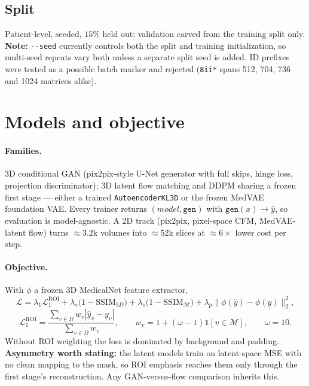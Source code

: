 \documentclass[11pt]{article}
\newcommand{\yhat}{\hat{y}}
\newcommand{\roi}{\mathcal{M}}
\newcommand{\1}{\mathbb{1}}
\newcommand{\flag}[1]{\textcolor{red!60!black}{\textbf{#1}}}
\begin{document}
\subsection{Split}

Patient-level, seeded, $15\%$ held out; validation carved from the training split only.
\flag{Note:} \texttt{-{}-seed} currently controls both the split and training
initialization, so multi-seed repeats vary both unless a separate split seed is added.
ID prefixes were tested as a possible batch marker and rejected (\texttt{8ii*} spans 512,
704, 736 and 1024 matrices alike).

\section{Models and objective}

\paragraph{Families.} 3D conditional GAN (pix2pix-style U-Net generator with full skips,
hinge loss, projection discriminator); 3D latent flow matching and DDPM sharing a frozen
first stage --- either a trained \texttt{AutoencoderKL3D} or the frozen MedVAE foundation
VAE. Every trainer returns $(model, \texttt{gen})$ with $\texttt{gen}(x)\to\yhat$, so
evaluation is model-agnostic. A 2D track (pix2pix, pixel-space CFM, MedVAE-latent flow)
turns $\approx3.2$k volumes into $\approx52$k slices at $\approx6\times$ lower cost per step.

\paragraph{Objective.} With $\phi$ a frozen 3D MedicalNet feature extractor,
\begin{equation}
\mathcal{L}=\lambda_1\mathcal{L}_1^{\text{ROI}}
+\lambda_s\bigl(1-\mathrm{SSIM}_{3D}\bigr)
+\lambda_s\bigl(1-\mathrm{SSIM}_{\roi}\bigr)
+\lambda_p\bigl\|\phi(\yhat)-\phi(y)\bigr\|_2^2 ,
\end{equation}
\begin{equation}
\mathcal{L}_1^{\text{ROI}}=\frac{\sum_{v\in\Omega}w_v|\yhat_v-y_v|}{\sum_{v\in\Omega}w_v},
\qquad w_v=1+(\omega-1)\1[v\in\roi],\qquad \omega=10 .
\end{equation}
Without ROI weighting the loss is dominated by background and padding.
\flag{Asymmetry worth stating:} the latent models train on latent-space MSE with no clean
mapping to the mask, so ROI emphasis reaches them only through the first stage's
reconstruction. Any GAN-versus-flow comparison inherits this.
\end{document}
